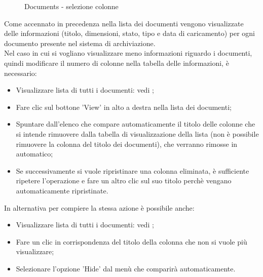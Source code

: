 \documentclass[10pt, a4paper]{article}
\begin{document}
\begin{figure}[H]
    \centering  
    \caption{Documents - selezione colonne}
    \label{img:selDocsColumns}
\end{figure}
Come accennato in precedenza nella lista dei documenti vengono visualizzate delle informazioni (titolo, dimensioni, stato, tipo e data di caricamento) per ogni documento presente nel sistema di archiviazione.\\ Nel caso in cui si vogliano visualizzare meno informazioni riguardo i documenti, quindi modificare il numero di colonne nella tabella delle informazioni, è necessario:
\begin{itemize}
    \item Visualizzare lista di tutti i documenti: vedi ;
    \item Fare clic sul bottone 'View' in alto a destra nella lista dei documenti;
    \item Spuntare dall'elenco che compare automaticamente il titolo delle colonne che si intende rimuovere dalla tabella di visualizzazione della lista (non è possibile rimuovere la colonna del titolo dei documenti), che verranno rimosse in automatico;
    \item Se successivamente si vuole ripristinare una colonna eliminata, è sufficiente ripetere l'operazione e fare un altro clic sul suo titolo perchè vengano automaticamente ripristinate.
\end{itemize}
In alternativa per compiere la stessa azione è possibile anche:
\begin{itemize}
    \item Visualizzare lista di tutti i documenti: vedi ;
    \item Fare un clic in corrispondenza del titolo della colonna che non si vuole più visualizzare;
    \item Selezionare l'opzione 'Hide' dal menù che comparirà automaticamente.
\end{itemize}
\end{document}
